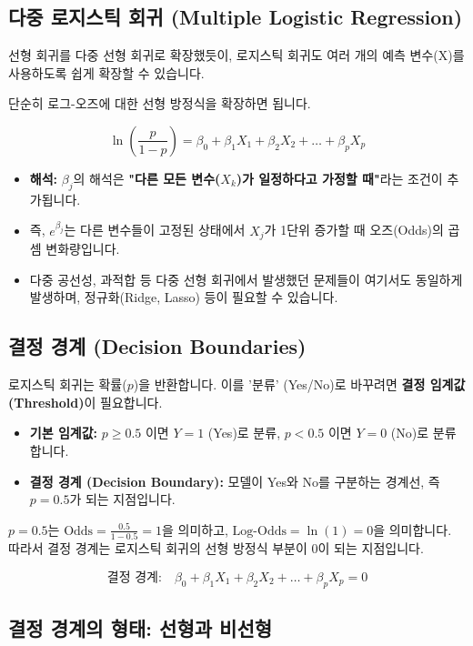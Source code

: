 \documentclass[11pt,a4paper]{book}
\theoremstyle{definition}
\begin{document}
\subsection{다중 로지스틱 회귀 (Multiple Logistic Regression)}

선형 회귀를 다중 선형 회귀로 확장했듯이, 로지스틱 회귀도 여러 개의 예측 변수(X)를 사용하도록 쉽게 확장할 수 있습니다.

단순히 로그-오즈에 대한 선형 방정식을 확장하면 됩니다.

$$ \ln\left( \frac{p}{1-p} \right) = \beta_0 + \beta_1 X_1 + \beta_2 X_2 + \dots + \beta_p X_p $$

\begin{itemize}
    \item \textbf{해석:} $\beta_j$의 해석은 \textbf{"다른 모든 변수($X_k$)가 일정하다고 가정할 때"}라는 조건이 추가됩니다.
    \item 즉, $e^{\beta_j}$는 다른 변수들이 고정된 상태에서 $X_j$가 1단위 증가할 때 오즈(Odds)의 곱셈 변화량입니다.
    \item 다중 공선성, 과적합 등 다중 선형 회귀에서 발생했던 문제들이 여기서도 동일하게 발생하며, 정규화(Ridge, Lasso) 등이 필요할 수 있습니다.
\end{itemize}

\subsection{결정 경계 (Decision Boundaries)}

로지스틱 회귀는 확률($p$)을 반환합니다. 이를 '분류' (Yes/No)로 바꾸려면 \textbf{결정 임계값(Threshold)}이 필요합니다.

\begin{itemize}
    \item \textbf{기본 임계값:} $p \ge 0.5$ 이면 $Y=1$ (Yes)로 분류, $p < 0.5$ 이면 $Y=0$ (No)로 분류합니다.
    \item \textbf{결정 경계 (Decision Boundary):} 모델이 Yes와 No를 구분하는 경계선, 즉 $p=0.5$가 되는 지점입니다.
\end{itemize}

$p=0.5$는 $\text{Odds} = \frac{0.5}{1-0.5} = 1$을 의미하고, $\text{Log-Odds} = \ln(1) = 0$을 의미합니다.
따라서 결정 경계는 로지스틱 회귀의 선형 방정식 부분이 0이 되는 지점입니다.

$$ \textbf{결정 경계:} \quad \beta_0 + \beta_1 X_1 + \beta_2 X_2 + \dots + \beta_p X_p = 0 $$

\subsection{결정 경계의 형태: 선형과 비선형}
\end{document}
